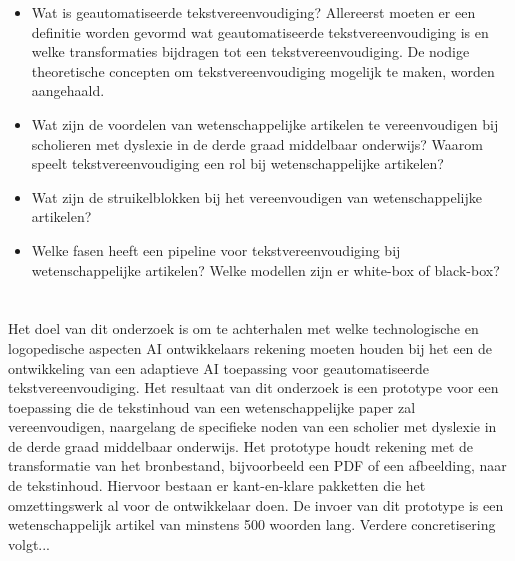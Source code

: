 \begin{itemize}
	\item Wat is geautomatiseerde tekstvereenvoudiging? Allereerst moeten er een definitie worden gevormd wat geautomatiseerde tekstvereenvoudiging is en welke transformaties bijdragen tot een tekstvereenvoudiging. De nodige theoretische concepten om tekstvereenvoudiging mogelijk te maken, worden aangehaald. 
	\item Wat zijn de voordelen van wetenschappelijke artikelen te vereenvoudigen bij scholieren met dyslexie in de derde graad middelbaar onderwijs? Waarom speelt tekstvereenvoudiging een rol bij wetenschappelijke artikelen?
	\item Wat zijn de struikelblokken bij het vereenvoudigen van wetenschappelijke artikelen?
	\item Welke fasen heeft een pipeline voor tekstvereenvoudiging bij wetenschappelijke artikelen? Welke modellen zijn er white-box of black-box?
\end{itemize}


\section{}%
\label{sec:onderzoeksdoelstelling}


Het doel van dit onderzoek is om te achterhalen met welke technologische en logopedische aspecten AI ontwikkelaars rekening moeten houden bij het een de ontwikkeling van een adaptieve AI toepassing voor geautomatiseerde tekstvereenvoudiging. Het resultaat van dit onderzoek is een prototype voor een toepassing die de tekstinhoud van een wetenschappelijke paper zal vereenvoudigen, naargelang de specifieke noden van een scholier met dyslexie in de derde graad middelbaar onderwijs. Het prototype houdt rekening met de transformatie van het bronbestand, bijvoorbeeld een PDF of een afbeelding, naar de tekstinhoud. Hiervoor bestaan er kant-en-klare pakketten die het omzettingswerk al voor de ontwikkelaar doen. De invoer van dit prototype is een wetenschappelijk artikel van minstens 500 woorden lang. Verdere concretisering volgt...



